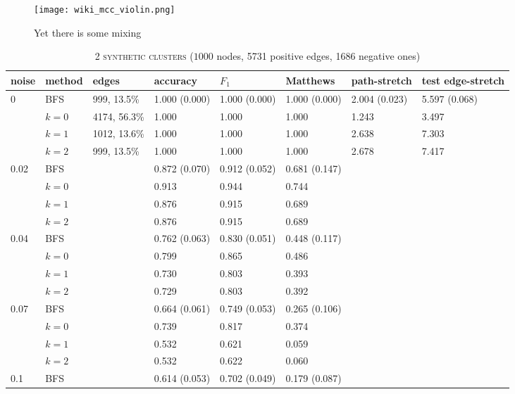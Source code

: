 \documentclass[a4paper,final,notitlepage,11pt,svgnames]{scrartcl}
\begin{document}
\begin{figure}[htpb]
	\centering
	\texttt{[image: wiki\_mcc\_violin.png]}
	\caption{Yet there is some mixing \label{fig:violin}}
\end{figure}
\begin{table}[htpb]
	\centering
	\caption{\textsc{2 synthetic clusters} ($1000$ nodes, 5731 positive edges, 1686 negative ones) \label{tab:synth}}
	\begin{tabular}{llllllll}
		\toprule
		noise           & method & edges        & accuracy      & $F_1$         & Matthews            & path-stretch & test edge-stretch \\
		\midrule
		\multirow{4}{*}{0} & BFS    & 999, 13.5\%  & 1.000 (0.000) & 1.000 (0.000) & 1.000 (0.000)     & 2.004 (0.023)  & 5.597 (0.068) \\
		                & $k=0$  & 4174, 56.3\% & 1.000         & 1.000         & 1.000         & 1.243 & 3.497 \\
		                & $k=1$  & 1012, 13.6\% & 1.000         & 1.000         & 1.000         & 2.638 & 7.303 \\
		                & $k=2$  & 999, 13.5\%  & 1.000         & 1.000         & 1.000         & 2.678 & 7.417 \\
						\midrule
\multirow{4}{*}{0.02} & BFS & & 0.872 (0.070) & 0.912 (0.052) & 0.681 (0.147)  & & \\
& $k=0$ & & 0.913         & 0.944         & 0.744  & & \\
& $k=1$ & & 0.876         & 0.915         & 0.689  & & \\
& $k=2$ & & 0.876         & 0.915         & 0.689  & & \\
\multirow{4}{*}{0.04} & BFS & & 0.762 (0.063) & 0.830 (0.051) & 0.448 (0.117)  & & \\
& $k=0$ & & 0.799         & 0.865         & 0.486  & & \\
& $k=1$ & & 0.730         & 0.803         & 0.393  & & \\
& $k=2$ & & 0.729         & 0.803         & 0.392  & & \\
\multirow{4}{*}{0.07} & BFS & & 0.664 (0.061) & 0.749 (0.053) & 0.265 (0.106)  & & \\
& $k=0$ & & 0.739         & 0.817         & 0.374  & & \\
& $k=1$ & & 0.532         & 0.621         & 0.059  & & \\
& $k=2$ & & 0.532         & 0.622         & 0.060  & & \\
\multirow{4}{*}{0.1} & BFS & & 0.614 (0.053) & 0.702 (0.049) & 0.179 (0.087)  & & \\

\end{tabular}
\end{table}
\end{document}
